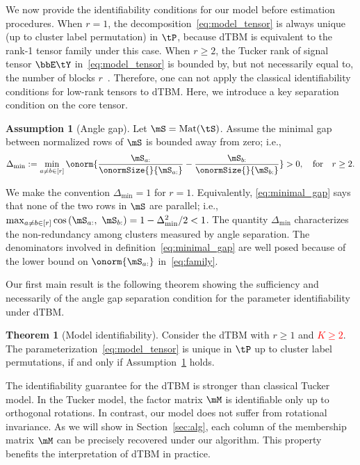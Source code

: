 \documentclass[lettersize,onecolumn,journal]{IEEEtran}
\theoremstyle{definition}
\newtheorem{thm}{Theorem}
\theoremstyle{definition}
\newtheorem{assumption}{Assumption}
\newcommand{\of}[1]{\left(#1\right)}
\begin{document}
We now provide the identifiability conditions for our model before estimation procedures. When $r=1$, the decomposition~\eqref{eq:model_tensor} is always unique (up to cluster label permutation) in $\tP$, because dTBM is equivalent to the rank-1 tensor family under this case. When $r\geq 2$, the Tucker rank of signal tensor $\bbE\tY$ in~\eqref{eq:model_tensor} is bounded by, but not necessarily equal to, the number of blocks $r$~\citep{wang2019multiway}. Therefore, one can not apply the classical identifiability conditions for low-rank tensors to dTBM. Here, we introduce a key separation condition on the core tensor. 

\begin{assumption}[Angle gap] \label{assmp:min_gap}Let $\mS = \text{Mat}(\tS)$. Assume the minimal gap between normalized rows of $\mS$ is bounded away from zero; i.e.,
\begin{equation}\label{eq:minimal_gap}
    \Delta_{\min} := \min_{a \neq b \in [r]} \onorm{\frac{\mS_{a:}}{\onormSize{}{ \mS_{a:}}} - \frac{\mS_{b:}}{\onormSize{}{ \mS_{b:}}} }>0, \quad \text{for} \quad r \geq 2.
\end{equation}
\end{assumption}
We make the convention $\Delta_{\min} = 1$ for $r = 1$. Equivalently, \eqref{eq:minimal_gap} says that none of the two rows in $\mS$ are parallel; i.e., $\max_{a \neq b\in [r]}\cos \of{\mS_{a:},\  \mS_{b:}}  = 1-\Delta^2_{\min}/2<1$. The quantity $\Delta_{\min}$ characterizes the non-redundancy among clusters measured by angle separation. The denominators involved in definition~\eqref{eq:minimal_gap} are well posed because of the lower bound on $\onorm{\mS_{a:}}$ in~\eqref{eq:family}. 

Our first main result is the following theorem showing the sufficiency and necessarily of the angle gap separation condition for the parameter identifiability under dTBM. 

\begin{thm}[Model identifiability]\label{thm:unique} Consider the dTBM with $r\geq 1$ and \textcolor{red}{ $K \geq 2$}. The parameterization~\eqref{eq:model_tensor} is unique in $\tP$ up to cluster label permutations, if and only if Assumption~\ref{assmp:min_gap} holds.
\end{thm}

The identifiability guarantee for the dTBM is stronger than classical Tucker model. In the Tucker model, the factor matrix $\mM$ is identifiable only up to orthogonal rotations. In contrast, our model does not suffer from rotational invariance. As we will show in Section~\ref{sec:alg}, each column of the membership matrix $\mM$ can be precisely recovered under our algorithm. This property benefits the interpretation of dTBM in practice. 
\end{document}
